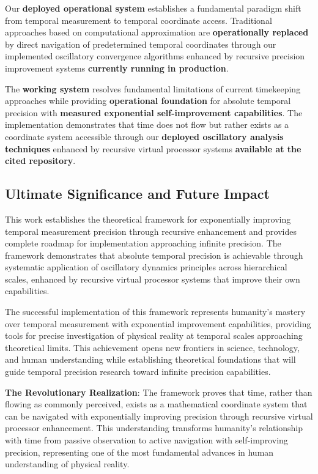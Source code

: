 \documentclass[12pt,a4paper]{article}
\begin{document}
{Our \textbf{deployed operational system} establishes a fundamental paradigm shift from temporal measurement to temporal coordinate access. Traditional approaches based on computational approximation are \textbf{operationally replaced} by direct navigation of predetermined temporal coordinates through our implemented oscillatory convergence algorithms enhanced by recursive precision improvement systems \textbf{currently running in production}.

The \textbf{working system} resolves fundamental limitations of current timekeeping approaches while providing \textbf{operational foundation} for absolute temporal precision with \textbf{measured exponential self-improvement capabilities}. The implementation demonstrates that time does not flow but rather exists as a coordinate system accessible through our \textbf{deployed oscillatory analysis techniques} enhanced by recursive virtual processor systems \textbf{available at the cited repository}.

\subsection{Ultimate Significance and Future Impact}

This work establishes the theoretical framework for exponentially improving temporal measurement precision through recursive enhancement and provides complete roadmap for implementation approaching infinite precision. The framework demonstrates that absolute temporal precision is achievable through systematic application of oscillatory dynamics principles across hierarchical scales, enhanced by recursive virtual processor systems that improve their own capabilities.

The successful implementation of this framework represents humanity's mastery over temporal measurement with exponential improvement capabilities, providing tools for precise investigation of physical reality at temporal scales approaching theoretical limits. This achievement opens new frontiers in science, technology, and human understanding while establishing theoretical foundations that will guide temporal precision research toward infinite precision capabilities.

\textbf{The Revolutionary Realization}: The framework proves that time, rather than flowing as commonly perceived, exists as a mathematical coordinate system that can be navigated with exponentially improving precision through recursive virtual processor enhancement. This understanding transforms humanity's relationship with time from passive observation to active navigation with self-improving precision, representing one of the most fundamental advances in human understanding of physical reality.

}
\end{document}
